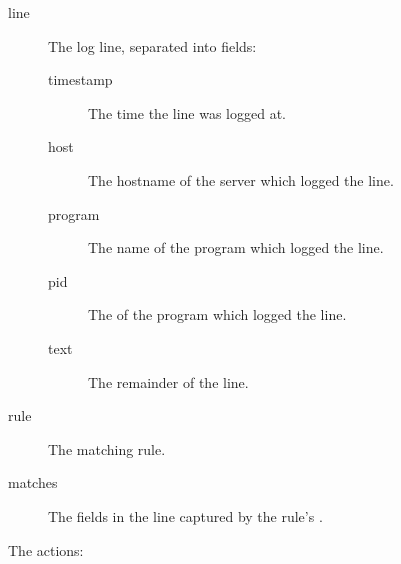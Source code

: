\documentclass[a4paper,12pt,draft]{article}
\begin{document}
\begin{description}

    \item [line] The log line, separated into fields:

        \begin{description}

            \item [timestamp] The time the line was logged at.

            \item [host] The hostname of the server which logged the line.

            \item [program] The name of the program which logged the line.

            \item [pid] The \pid{} of the program which logged the line.

            \item [text] The remainder of the line.

        \end{description}

    \item [rule] The matching rule.

    \item [matches] The fields in the line captured by the rule's \regex{}.

\end{description}

The actions:
\end{document}
